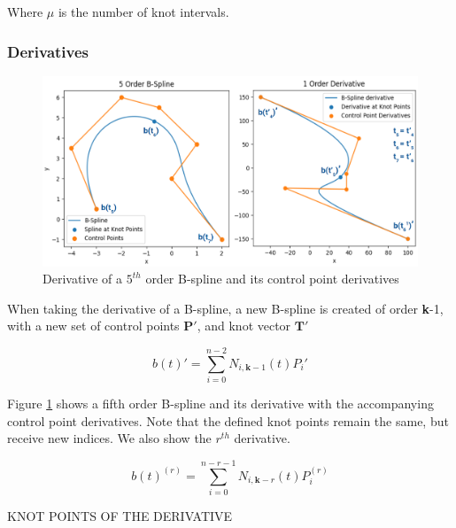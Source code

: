 \documentclass{article}
\begin{document}
Where \(\mu\) is the number of knot intervals.

\subsubsection{Derivatives}

\begin{figure}[H]
\begin{center}
\includegraphics[scale=.28]{BsplineDerivative.png}
\end{center}
\caption{Derivative of a \(5^{th}\) order B-spline and its control point derivatives}
\label{Fig:BsplineDerivative}
\end{figure}

When taking the derivative of a B-spline, a new B-spline is created of order \textbf{k}-1, with a new set of control points \(\textbf{P}'\), and knot vector \(\textbf{T}'\)

  \begin{equation} 
      b(t)' = \sum^{n-2}_{i=0} N_{i,\textbf{k}-1}(t) P_i'
  \end{equation}

Figure \ref{Fig:BsplineDerivative} shows a fifth order B-spline and its derivative with the accompanying control point derivatives. Note that the defined knot points remain the same, but receive new indices. We also show the \(r^{th}\) derivative.

  \begin{equation} 
      b(t)^{(r)} = \sum^{n-r-1}_{i=0} N_{i,\textbf{k}-r}(t) P_i^{(r)}
  \end{equation}
  
\hspace{1cm}

KNOT POINTS OF THE DERIVATIVE

\hspace{1cm}
\end{document}
